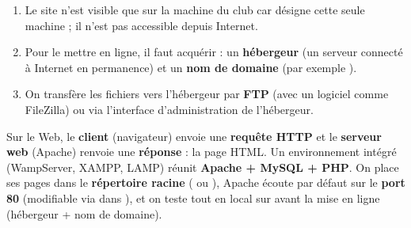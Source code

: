 \begin{enumerate}[label=\alph*)]
  \item Le site n'est visible que sur la machine du club car  désigne
        cette seule machine ; il n'est pas accessible depuis Internet.
  \item Pour le mettre en ligne, il faut acquérir : un \textbf{hébergeur} (un serveur
        connecté à Internet en permanence) et un \textbf{nom de domaine}
        (par exemple ).
  \item On transfère les fichiers vers l'hébergeur par \textbf{FTP} (avec un logiciel
        comme FileZilla) ou via l'interface d'administration de l'hébergeur.
\end{enumerate}

\begin{aretenir}
Sur le Web, le \textbf{client} (navigateur) envoie une \textbf{requête HTTP} et le
\textbf{serveur web} (Apache) renvoie une \textbf{réponse} : la page HTML. Un
environnement intégré (WampServer, XAMPP, LAMP) réunit \textbf{Apache + MySQL + PHP}.
On place ses pages dans le \textbf{répertoire racine} ( ou ),
Apache écoute par défaut sur le \textbf{port 80} (modifiable via  dans
), et on teste tout en local sur  avant la
mise en ligne (hébergeur + nom de domaine).
\end{aretenir}
